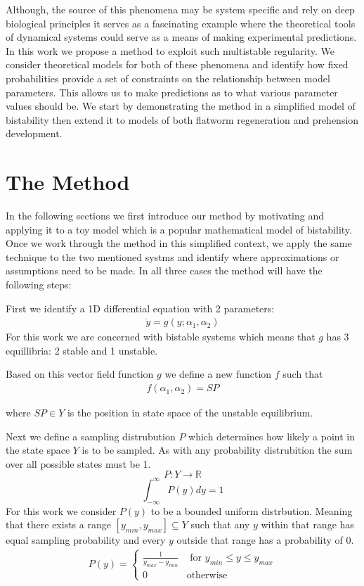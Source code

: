 \documentclass[letterpaper]{article}
\begin{document}
Although, the source of this phenomena may be system specific and rely on deep
biological principles it serves as a fascinating example where the theoretical 
tools of dynamical systems could serve as a means of making experimental predictions.
In this work we propose a method to exploit such multistable regularity. We consider
theoretical models for both of these phenomena and identify how fixed 
probabilities provide a set of constraints on the relationship between model
parameters. This allows us to make predictions as to what various parameter 
values should be. We start by demonstrating the method in a simplified model
of bistability  then extend it to models of both flatworm regeneration and
prehension development.

\section{The Method}
In the following sections we first introduce our method by motivating
and applying it to a toy model which is a popular mathematical model
of bistability. Once we work through the method in this simplified 
context, we apply the same technique to the two mentioned systms and 
identify where approximations or assumptions need to be made.
In all three cases the method will have the following steps:

First we identify a 1D differential equation with 2 parameters: 
\begin{eqnarray}
  \label{ydot}
  \dot{y} = g(y; \alpha_1, \alpha_2)
\end{eqnarray}
For this work we are concerned with bistable systems which means that $g$
has 3 equillibria: 2 stable and 1 unstable.

Based on this vector field function $g$ we define a new function $f$ such that
\begin{eqnarray}
  f(\alpha_1,\alpha_2) = SP
\end{eqnarray} 

where $SP \in Y$ is the position in state space of the
unstable equilibrium.

Next we define a sampling distrubution $P$ which determines how likely a 
point in the state space $Y$ is to be sampled. As with any probability distrubition
the sum over all possible states must be 1.
\[
  P:Y\rightarrow \mathbb{R}
  \]
\[
  \int_{-\infty}^{\infty}P(y)dy = 1
\]
For this work we consider $P(y)$ to be a bounded uniform distrbution.
Meaning that there exists a range $[y_{min},y_{max}]\subseteq Y$ such that any $y$ 
within that range has equal sampling probability and every $y$ outside
that range has a probability of $0$.
\begin{eqnarray}
  \label{bound_uniform}
    P(y) = \begin{cases}
        \frac{1}{y_{max} - y_{min}} & \text{ for } y_{min}\leq y\leq y_{max}\\
        0 & \text{otherwise}
    \end{cases}
\end{eqnarray}
\end{document}
